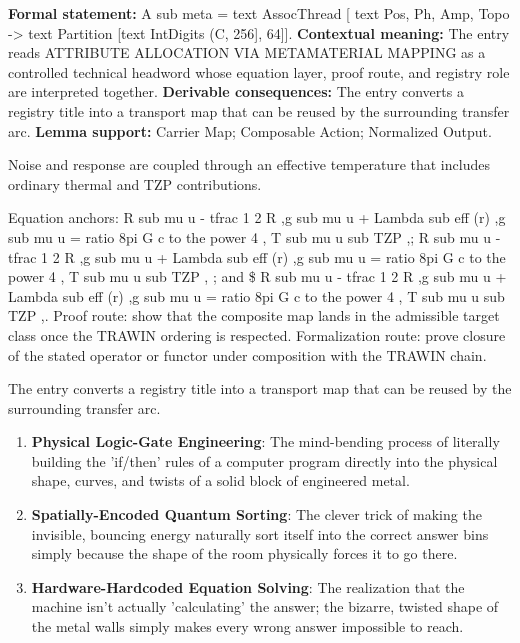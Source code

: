 \begingroup\footnotesize\setlength{\emergencystretch}{3em}\sloppy
\textbf{Formal statement:} A sub meta = text AssocThread [ text Pos, Ph, Amp, Topo -> text Partition [text IntDigits (C, 256], 64]]. \textbf{Contextual meaning:} The entry reads ATTRIBUTE ALLOCATION VIA METAMATERIAL MAPPING as a controlled technical headword whose equation layer, proof route, and registry role are interpreted together. \textbf{Derivable consequences:} The entry converts a registry title into a transport map that can be reused by the surrounding transfer arc. \textbf{Lemma support:} Carrier Map; Composable Action; Normalized Output.\par
\endgroup

Noise and response are coupled through an effective temperature that includes ordinary thermal and TZP contributions.

Equation anchors: R sub mu u - tfrac 1 2 R ,g sub mu u + Lambda sub eff (r) ,g sub mu u = ratio 8pi G c to the power 4 , T sub mu u sub TZP ,; R sub mu u - tfrac 1 2 R ,g sub mu u + Lambda sub eff (r) ,g sub mu u = ratio 8pi G c to the power 4 , T sub mu u sub TZP , ; and \$ R sub mu u - tfrac 1 2 R ,g sub mu u + Lambda sub eff (r) ,g sub mu u = ratio 8pi G c to the power 4 , T sub mu u sub TZP ,. Proof route: show that the composite map lands in the admissible target class once the TRAWIN ordering is respected. Formalization route: prove closure of the stated operator or functor under composition with the TRAWIN chain.

The entry converts a registry title into a transport map that can be reused by the surrounding transfer arc.
\endgroup

\begin{enumerate}[leftmargin=1.6em,itemsep=6pt,topsep=4pt]
\item \textbf{Physical Logic-Gate Engineering}: The mind-bending process of literally building the 'if/then' rules of a computer program directly into the physical shape, curves, and twists of a solid block of engineered metal.
\item \textbf{Spatially-Encoded Quantum Sorting}: The clever trick of making the invisible, bouncing energy naturally sort itself into the correct answer bins simply because the shape of the room physically forces it to go there.
\item \textbf{Hardware-Hardcoded Equation Solving}: The realization that the machine isn't actually 'calculating' the answer; the bizarre, twisted shape of the metal walls simply makes every wrong answer impossible to reach.
\end{enumerate}

